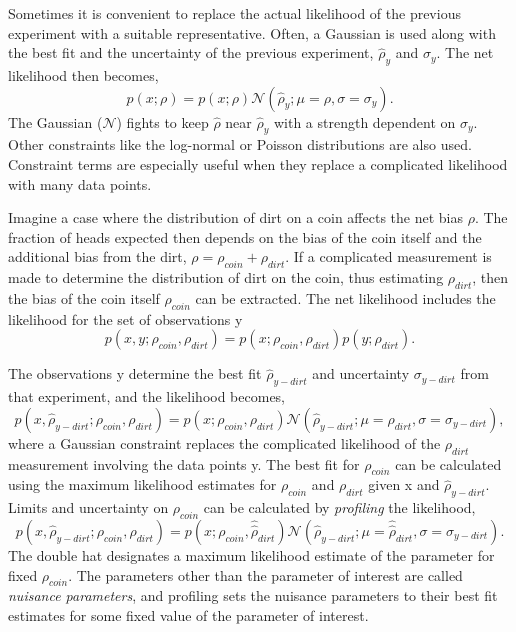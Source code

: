 \documentclass[12pt]{article}
\begin{document}
Sometimes it is convenient to replace the actual likelihood of the previous experiment with a suitable representative. Often, a Gaussian is used along with the best fit and the uncertainty of the previous experiment, $\hat{\rho}_{y}$ and $\sigma_y$. The net likelihood then becomes,
\begin{equation}
p(x; \rho) = p(x; \rho) \mathcal{N}(\hat{\rho}_y; \mu=\rho, \sigma=\sigma_y).
\end{equation}
The Gaussian ($\mathcal{N}$) fights to keep $\hat{\rho}$ near $\hat{\rho}_y$ with a strength dependent on $\sigma_y$. Other constraints like the log-normal or Poisson distributions are also used. Constraint terms are especially useful when they replace a complicated likelihood with many data points. 

Imagine a case where the distribution of dirt on a coin affects the net bias $\rho$. The fraction of heads expected then depends on the bias of the coin itself and the additional bias from the dirt, $\rho = \rho_{coin} + \rho_{dirt}$. If a complicated measurement is made to determine the distribution of dirt on the coin, thus estimating $\rho_{dirt}$, then the bias of the coin itself $\rho_{coin}$ can be extracted. The net likelihood includes the likelihood for the set of observations y
\begin{equation}
p(x, y; \rho_{coin}, \rho_{dirt}) = p(x; \rho_{coin}, \rho_{dirt})p(y; \rho_{dirt}).
\end{equation}

The observations y determine the best fit $\hat{\rho}_{y-dirt}$ and uncertainty $\sigma_{y-dirt}$ from that experiment, and the likelihood becomes, 
\begin{equation}
p(x, \hat{\rho}_{y-dirt}; \rho_{coin}, \rho_{dirt}) = p(x; \rho_{coin}, \rho_{dirt})
                                   \mathcal{N}(\hat{\rho}_{y-dirt}; \mu=\rho_{dirt}, \sigma=\sigma_{y-dirt}),
\end{equation}
where a Gaussian constraint replaces the complicated likelihood of the $\rho_{dirt}$ measurement involving the data points y. The best fit for $\rho_{coin}$ can be calculated using the maximum likelihood estimates for $\rho_{coin}$ and $\rho_{dirt}$ given x and $\hat{\rho}_{y-dirt}$. Limits and uncertainty on $\rho_{coin}$ can be calculated by \textit{profiling} the likelihood,  
\begin{equation}
p(x, \hat{\rho}_{y-dirt}; \rho_{coin}, \hat{\hat{\rho}}_{dirt}) = p(x; \rho_{coin}, \hat{\hat{\rho}}_{dirt})
                                   \mathcal{N}(\hat{\rho}_{y-dirt}; \mu=\hat{\hat{\rho}}_{dirt}, \sigma=\sigma_{y-dirt}).
\end{equation}
The double hat designates a maximum likelihood estimate of the parameter for fixed $\rho_{coin}$. The parameters other than the parameter of interest are called \textit{nuisance parameters}, and profiling sets the nuisance parameters to their best fit estimates for some fixed value of the parameter of interest. 
\end{document}
